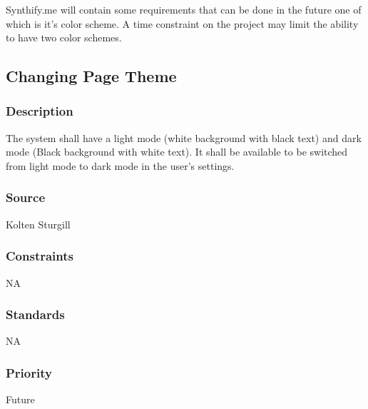 Synthify.me will contain some requirements that can be done in the future one of which is it's color scheme. A time constraint on the project may limit the ability to have two color schemes.

\subsection{Changing Page Theme}
\subsubsection{Description}
The system shall have a light mode (white background with black text) and dark mode (Black background with white text). It shall be available to be switched from light mode to dark mode in the user's settings.
\subsubsection{Source}
Kolten Sturgill
\subsubsection{Constraints}
NA
\subsubsection{Standards}
NA
\subsubsection{Priority}
Future